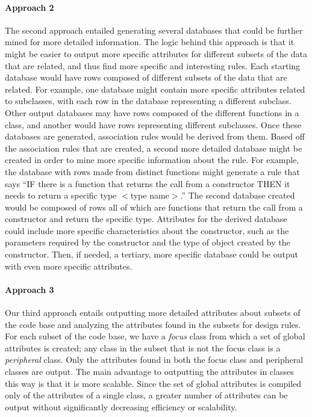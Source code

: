 \documentclass[12pt]{article}
\begin{document}
	\paragraph{Approach 2}
	
	The second approach entailed generating several databases that could be further mined for more detailed information. The logic behind this approach is that it might be easier to output more specific attributes for different subsets of the data that are related, and thus find more specific and interesting rules. Each starting database would have rows composed of different subsets of the data that are related. For example, one database might contain more specific attributes related to subclasses, with each row in the database representing a different subclass. Other output databases may have rows composed of the different functions in a class, and another would have rows representing different subclasses. Once these databases are generated, association rules would be derived from them. Based off the association rules that are created, a second more detailed database might be created in order to mine more specific information about the rule. For example, the database with rows made from distinct functions might generate a rule that says “IF there is a function that returns the call from a constructor 
THEN it needs to return a specific type $<$type name$>$.” The second database created would be composed of rows all of which are functions that return the call from a constructor and return the specific type. Attributes for the derived database could include more specific characteristics about the constructor, such as the parameters required by the constructor and the type of object created by the constructor. Then, if needed, a tertiary, more specific database could be output with even more specific attributes.

	\paragraph{Approach 3}
	
	Our third approach entails outputting more detailed attributes about subsets of the code base and analyzing the attributes found in the subsets for design rules. For each subset of the code base, we have a \textit{focus} class from which a set of global attributes is created; any class in the subset that is not the focus class is a \textit{peripheral} class. Only the attributes found in both the focus class and peripheral classes are output. The main advantage to outputting the attributes in classes this way is that it is more scalable. Since the set of global attributes is compiled only of the attributes of a single class, a greater number of attributes can be output without significantly decreasing efficiency or scalability.
	
\end{document}
